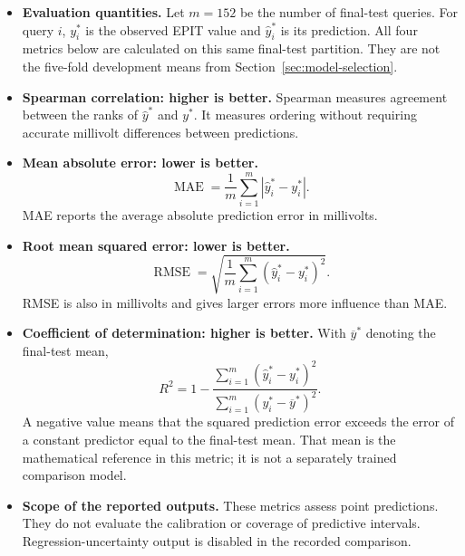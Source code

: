 \documentclass[11pt]{article}
\newenvironment{notes}
  {\begin{itemize}\setlength{\itemsep}{0.45em}\setlength{\parsep}{0pt}}
  {\end{itemize}}
\begin{document}
\begin{notes}
    \item \textbf{Evaluation quantities.}
    Let \(m=152\) be the number of final-test queries.
    For query \(i\), \(y_i^\ast\) is the observed EPIT value
    and \(\widehat y_i^\ast\) is its prediction.
    All four metrics below are calculated on this same
    final-test partition. They are not the five-fold
    development means from Section~\ref{sec:model-selection}.

    \item \textbf{Spearman correlation: higher is better.}
    Spearman measures agreement between the ranks of
    \(\widehat y^\ast\) and \(y^\ast\).
    It measures ordering without requiring accurate
    millivolt differences between predictions.

    \item \textbf{Mean absolute error: lower is better.}
    \begin{equation}
        \operatorname{MAE}
        =
        \frac{1}{m}\sum_{i=1}^{m}
        \left|\widehat y_i^\ast-y_i^\ast\right|.
        \label{eq:final-mae}
    \end{equation}
    MAE reports the average absolute prediction error in
    millivolts.

    \item \textbf{Root mean squared error: lower is better.}
    \begin{equation}
        \operatorname{RMSE}
        =
        \sqrt{\frac{1}{m}\sum_{i=1}^{m}
        \left(\widehat y_i^\ast-y_i^\ast\right)^2}.
        \label{eq:final-rmse}
    \end{equation}
    RMSE is also in millivolts and gives larger errors more
    influence than MAE.

    \item \textbf{Coefficient of determination: higher is better.}
    With \(\overline y^\ast\) denoting the final-test mean,
    \begin{equation}
        R^2
        =
        1-
        \frac{\sum_{i=1}^{m}
            (\widehat y_i^\ast-y_i^\ast)^2}
             {\sum_{i=1}^{m}
            (y_i^\ast-\overline y^\ast)^2}.
        \label{eq:final-r-squared}
    \end{equation}
    A negative value means that the squared prediction
    error exceeds the error of a constant predictor equal
    to the final-test mean. That mean is the mathematical
    reference in this metric; it is not a separately trained
    comparison model.

    \item \textbf{Scope of the reported outputs.}
    These metrics assess point predictions.
    They do not evaluate the calibration or coverage of
    predictive intervals. Regression-uncertainty output is
    disabled in the recorded comparison.
\end{notes}
\end{document}
